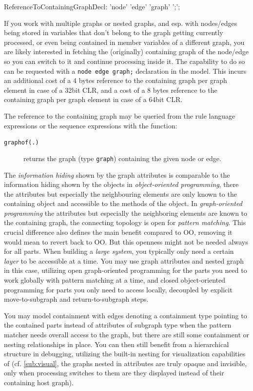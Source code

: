 \begin{rail}
  ReferenceToContainingGraphDecl: 'node' 'edge' 'graph' ';';
\end{rail}

If you work with multiple graphs or nested graphs, and esp. with nodes/edges being stored in variables that don't belong to the graph getting currently processed, or even being contained in member variables of a different graph, you are likely interested in fetching the (originally) containing graph of the node/edge so you can switch to it and continue processing inside it.
The capability to do so can be requested with a \texttt{node edge graph;} declaration in the model.
This incurs an additional cost of a 4 bytes reference to the containing graph per graph element in case of a 32bit CLR, and a cost of a 8 bytes reference to the containing graph per graph element in case of a 64bit CLR.

The reference to the containing graph may be queried from the rule language expressions or the sequence expressions with the \texttt{} function:
\begin{description}
\item[\texttt{graphof(.)}] returns the graph (type \texttt{graph}) containing the given node or edge.
\end{description}

The \emph{information hiding} shown by the graph attributes is comparable to the information hiding shown by the objects in \emph{object-oriented programming}, there the attributes but especially the neighbouring elements are only known to the containing object and accessible to the methods of the object.
In \emph{graph-oriented programming} the attributes but especially the neighboring elements are known to the containing graph, the connecting topology is open for \emph{pattern matching}.
This crucial difference also defines the main benefit compared to OO, removing it would mean to revert back to OO.
But this openness might not be needed always for all parts.
When building a \emph{large system}, you typically only need a certain \emph{layer} to be accessible at a time.
You may use graph attributes and nested graph in this case,
utilizing open graph-oriented programming for the parts you need to work globally with pattern matching at a time,
and closed object-oriented programming for parts you only need to access locally,
decoupled by explicit move-to-subgraph and return-to-subgraph steps.

You may model containment with edges denoting a containment type pointing to the contained parts instead of attributes of subgraph type
when the pattern matcher needs overall access to the graph, but there are still some containment or nesting relationships in place.
You can then still benefit from a hierarchical structure in debugging, utilizing the built-in nesting for visualization capabilities of \GrG (cf. \ref{sub:visual}, the graphs nested in attributes are truly opaque and invisible, only when processing switches to them are they displayed instead of their containing host graph).

